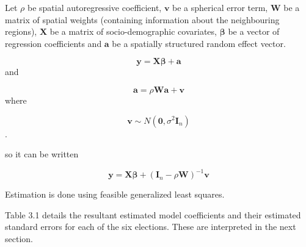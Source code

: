 \documentclass[openany]{book}
\begin{document}
Let \(\rho\) be spatial autoregressive coefficient, \(\boldsymbol v\) be a spherical error term, \({\boldsymbol W}\) be a matrix of spatial weights (containing information about the neighbouring regions), \(\boldsymbol X\) be a matrix of socio-demographic covariates, \(\boldsymbol \beta\) be a vector of regression coefficients and \(\boldsymbol a\) be a spatially structured random effect vector.

\[{\boldsymbol y} = {\boldsymbol X} {\boldsymbol \beta} + {\boldsymbol a}\]
and

\[{\boldsymbol a} = \rho {\boldsymbol W} {\boldsymbol a} + {\boldsymbol v}\]
where

\[{\boldsymbol v} \sim N({\boldsymbol 0}, \sigma^2 {\boldsymbol I_n})\].

so it can be written

\[{\boldsymbol y} = {\boldsymbol X} {\boldsymbol \beta} + ({\boldsymbol I}_n-\rho {\boldsymbol W})^{-1}{\boldsymbol v}\]

Estimation is done using feasible generalized least squares.

Table 3.1 details the resultant estimated model coefficients and their estimated standard errors for each of the six elections. These are interpreted in the next section.
\end{document}
